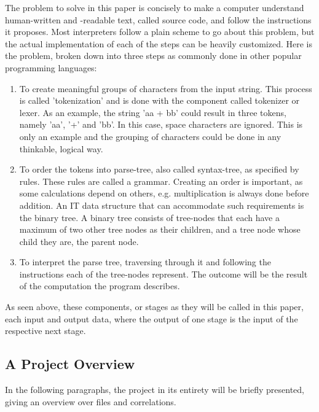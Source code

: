 \documentclass[12pt,a4paper]{article}
\newcommand{\pagelabel}[1]{\phantomsection\label{#1}}
\begin{document}
The problem to solve in this paper is concisely to make a computer understand
human-written and -readable text, called source code, and follow the instructions
it proposes.
Most interpreters follow a plain scheme to go about this problem, but the
actual implementation of each of the steps can be heavily customized.
Here is the problem, broken down into three steps as commonly done in other
popular programming languages:
\begin{enumerate}\pagelabel{simple_interpreter}
    \item To create meaningful groups of characters from the input string. This
        process is called 'tokenization' and is done with the component called
        tokenizer or lexer. As an example, the string 'aa + bb' could result
        in three tokens, namely 'aa', '+' and 'bb'. In this case, space characters
        are ignored. 
        This is only an example and the grouping of characters could be done 
        in any thinkable, logical way.
    \item To order the tokens into parse-tree, also called syntax-tree, as
        specified by rules. These rules are called a grammar.
        Creating an order is important, as some calculations depend on others, e.g. multiplication
        is always done before addition. An IT data structure that can accommodate
        such requirements is the binary tree. A binary tree consists of tree-nodes
        that each have a maximum of two other tree nodes as their children, and
        a tree node whose child they are, the parent node.
    \item To interpret the parse tree, traversing through it and following the
        instructions each of the tree-nodes represent. The outcome
        will be the result of the computation the program describes.
\end{enumerate}

As seen above, these components, or stages as they will be called in this paper,
each input and output data, where the output of one stage is the input of the
respective next stage.

\subsection{A Project Overview}
In the following paragraphs, the project in its entirety will be briefly
presented, giving an overview over files and correlations.
\end{document}
